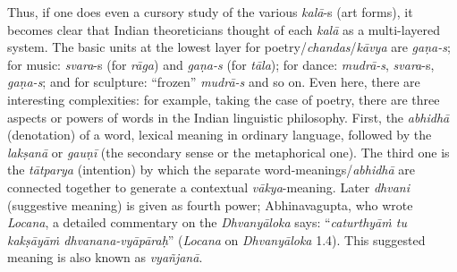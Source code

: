 Thus, if one does even a cursory study of the various \textsl{kalā}-s (art forms), it becomes clear that Indian theoreticians thought of each \textsl{kalā} as a multi-layered system. The basic units at the lowest layer for poetry/\textsl{chandas}/\textsl{kāvya} are \textsl{gaṇa-s}; for music: \textsl{svara}-s (for \textsl{rāga}) and \textsl{gaṇa-s} (for \textsl{tāla}); for dance: \textsl{mudrā-s}, \textsl{svara}-s, \textsl{gaṇa-s}; and for sculpture: “frozen” \textsl{mudrā-s} and so on. Even here, there are interesting complexities: for example, taking the case of poetry, there are three aspects or powers of words in the Indian linguistic philosophy. First, the \textsl{abhidhā} (denotation) of a word, lexical meaning in ordinary language, followed by the \textsl{lakṣanā} or \textsl{gauṇī} (the secondary sense or the metaphorical one). The third one is the \textsl{tātparya} (intention) by which the separate word-meanings/\textsl{abhidhā} are connected together to generate a contextual \textsl{vākya}-meaning. Later \textsl{dhvani} (suggestive meaning) is given as fourth power; Abhinavagupta, who wrote \textsl{Locana}, a detailed commentary on the \textsl{Dhvanyāloka} says: “\textsl{caturthyāṁ tu kakṣāyāṁ dhvanana-vyāpāraḥ}” (\textsl{Locana} on \textsl{Dhvanyāloka} 1.4). This suggested meaning is also known as \textsl{vyañjanā}.

